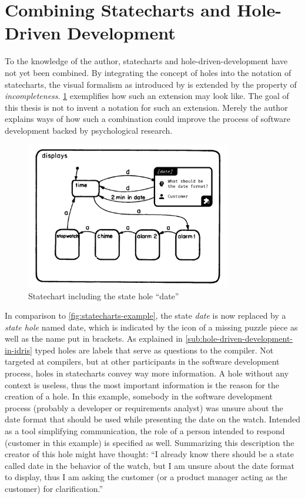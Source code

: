 \section{Combining Statecharts and Hole-Driven Development}
\label{sec:combining-statecharts-and-hole-driven-development}
To the knowledge of the author, statecharts and hole-driven-development have not yet been combined.
By integrating the concept of holes into the notation of statecharts, the visual formalism as introduced by \textcite{harel_statecharts:_1987} is extended by the property of \emph{incompleteness}.
\cref{fig:statecharts-hole-example} exemplifies how such an extension may look like.
The goal of this thesis is not to invent a notation for such an extension.
Merely the author explains ways of how such a combination could improve the process of software development backed by psychological research.
\begin{figure}[h]
\centering
\includegraphics[width=0.8\textwidth]{images/statechart-hole-example}
\caption{Statechart including the state hole ``date''}
\label{fig:statecharts-hole-example}
\end{figure}
In comparison to \cref{fig:statecharts-example}, the state \emph{date} is now replaced by a \emph{state hole} named date, which is indicated by the icon of a missing puzzle piece as well as the name put in brackets.
As explained in \cref{sub:hole-driven-development-in-idris} typed holes are labels that serve as questions to the compiler.
Not targeted at compilers, but at other participants in the software development process, holes in statecharts convey way more information.
A hole without any context is useless, thus the most important information is the reason for the creation of a hole.
In this example, somebody in the software development process (probably a developer or requirements analyst) was unsure about the date format that should be used while presenting the date on the watch.
Intended as a tool simplifying communication, the role of a person intended to respond (customer in this example) is specified as well.
Summarizing this description the creator of this hole might have thought: ``I already know there should be a state called date in the behavior of the watch, but I am unsure about the date format to display, thus I am asking the customer (or a product manager acting as the customer) for clarification.''

